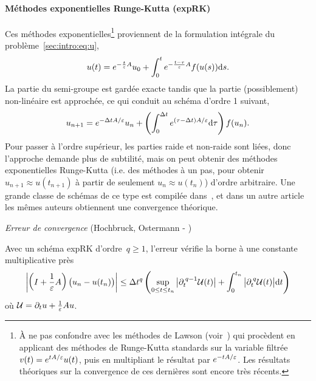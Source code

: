 

\paragraph{Méthodes exponentielles Runge-Kutta (expRK)\\}

Ces méthodes exponentielles\footnote{À ne pas confondre avec les méthodes de Lawson (voir~\cite{lawson.1967.generalized,hochbruck.2020.convergence}) qui procèdent en applicant des méthodes de Runge-Kutta standards sur la variable filtrée $v(t) = e^{t A/\varepsilon}u(t)$, puis en multipliant le résultat par $e^{-t A/\varepsilon}$. Les résultats théoriques sur la convergence de ces dernières sont encore très récents.} proviennent de la formulation intégrale du problème~\eqref{sec:intro:eq:u}, 
\begin{equation*}
    u(t) = e^{-\frac{t}{\varepsilon}A}u_0 + \int_0^t e^{-\frac{t-\tau}{\varepsilon}A} f(u(s)) \mathrm{d} s .
\end{equation*}
La partie du semi-groupe est gardée exacte tandis que la partie (possiblement) non-linéaire est approchée, ce qui conduit au schéma d'ordre 1 suivant,
\begin{equation} \label{sec:intro:eq:expEuler}
    u_{n+1} = e^{-\Delta t A/\varepsilon} u_n + \left(\int_0^{\Delta t} e^{(\tau-\Delta t) A/\varepsilon} \mathrm{d}\tau \right) f(u_n) .
\end{equation}
Pour passer à l'ordre supérieur, les parties raide et non-raide sont liées, donc l'approche demande plus de subtilité, mais on peut obtenir des méthodes exponentielles Runge-Kutta (i.e. des méthodes à un pas, pour obtenir $u_{n+1} \approx u(t_{n+1})$ à partir de seulement $u_n \approx u(t_n)$) d'ordre arbitraire. Une grande classe de schémas de ce type est compilée dans~\cite{hochbruck.2005.explicit}, et dans un autre article les mêmes auteurs obtiennent une convergence théorique. 

\medskip\noindent%
\textit{Erreur de convergence} (Hochbruck, Ostermann - \cite{hochbruck.2004.exponential})

Avec un schéma expRK d'ordre~$q \geq 1$, l'erreur vérifie la borne à une constante multiplicative près
\begin{equation*}
    \left| 
        \left( I + \frac{1}{\varepsilon}A \right) \big( u_n - u(t_n) \big) 
    \right|
    \leq \Delta t^{q} \left( 
        \sup_{0 \leq t \leq t_n} \big| \partial_t^{\: q-1} \mathcal{U}(t) \big| 
        + \int_0^{t_n} \big| \partial_t^{\: q} \mathcal{U}(t) \big| \mathrm{d} t 
    \right) 
\end{equation*}
où $\mathcal{U} = \partial_t u + \frac{1}{\varepsilon}Au$. 

